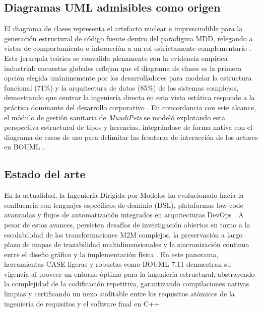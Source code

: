 \documentclass[journal,onecolumn]{IEEEtran}
\begin{document}
	\subsection{Diagramas UML admisibles como origen}
	El diagrama de clases representa el artefacto nuclear e imprescindible para la generación estructural de código fuente dentro del paradigma MDD, relegando a vistas de comportamiento o interacción a un rol estrictamente complementario \cite{Brambilla2017}. Esta jerarquía teórica se convalida plenamente con la evidencia empírica industrial: encuestas globales reflejan que el diagrama de clases es la primera opción elegida unánimemente por los desarrolladores para modelar la estructura funcional (71\%) y la arquitectura de datos (85\%) de los sistemas complejos, demostrando que centrar la ingeniería directa en esta vista estática responde a la práctica dominante del desarrollo corporativo \cite{Ozkaya2020}. En concordancia con este alcance, el módulo de gestión sanitaria de \textit{MundiPets} se modeló explotando esta perspectiva estructural de tipos y herencias, integrándose de forma nativa con el diagrama de casos de uso para delimitar las fronteras de interacción de los actores en BOUML \cite{GuiaMDD2026}.
	
	\subsection{Estado del arte}
	En la actualidad, la Ingeniería Dirigida por Modelos ha evolucionado hacia la confluencia con lenguajes específicos de dominio (DSL), plataformas low-code avanzadas y flujos de automatización integrados en arquitecturas DevOps \cite{Alharbi2026AutomaticCodeGeneration, Lehner2025}. A pesar de estos avances, persisten desafíos de investigación abiertos en torno a la escalabilidad de las transformaciones M2M complejos, la preservación a largo plazo de mapas de trazabilidad multidimensionales y la sincronización continua entre el diseño gráfico y la implementación física \cite{Kahani2019, Jongeling2022}. En este panorama, herramientas CASE ligeras y robustas como BOUML 7.11 demuestran su vigencia al proveer un entorno óptimo para la ingeniería estructural, abstrayendo la complejidad de la codificación repetitiva, garantizando compilaciones nativas limpias y certificando un nexo auditable entre los requisitos atómicos de la ingeniería de requisitos y el software final en C++ \cite{BOUML2025, GuiaMDD2026}.
	
\end{document}
